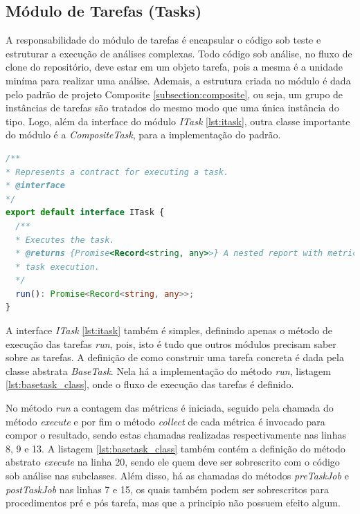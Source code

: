 \documentclass[12pt]{tcc}
\begin{document}
	\subsection{Módulo de Tarefas (Tasks)}
	\label{subsection:modulo-tasks}

	A responsabilidade do módulo de tarefas é encapsular o código sob teste e estruturar a execução de análises complexas.
	Todo código sob análise, no fluxo de clone do repositório, deve estar em um objeto tarefa, pois a mesma é a unidade miníma para realizar uma análise.
	Ademais, a estrutura criada no módulo é dada pelo padrão de projeto Composite \ref{subsection:composite}, ou seja, um grupo de instâncias de tarefas são tratados do mesmo modo que uma única instância do tipo.
	Logo, além da interface do módulo \emph{ITask} \ref{lst:itask}, outra classe importante do módulo é a \emph{CompositeTask}, para a implementação do padrão.

\begin{lstlisting}[label={lst:itask}, caption={Interface do módulo de tarefas.}, language=TypeScript, breaklines=true]
/**
* Represents a contract for executing a task.
* @interface
*/
export default interface ITask {
  /**
  * Executes the task.
  * @returns {Promise<Record<string, any>>} A nested report with metrics and metadata about the
  * task execution.
  */
  run(): Promise<Record<string, any>>;
}   
\end{lstlisting}

	A interface \emph{ITask} \ref{lst:itask} também é simples, definindo apenas o método de execução das tarefas \emph{run}, pois, isto é tudo que outros módulos precisam saber sobre as tarefas.
	A definição de como construir uma tarefa concreta é dada pela classe abstrata \emph{BaseTask}.
	Nela há a implementação do método \emph{run}, listagem \ref{lst:basetask_class}, onde o fluxo de execução das tarefas é definido.

	No método \emph{run} a contagem das métricas é iniciada, seguido pela chamada do método \emph{execute} e por fim o método \emph{collect} de cada métrica é invocado para compor o resultado, sendo estas chamadas realizadas respectivamente nas linhas 8, 9 e 13.
	A listagem \ref{lst:basetask_class} também contém a definição do método abstrato \emph{execute} na linha 20, sendo ele quem deve ser sobrescrito com o código sob análise nas subclasses.
	Além disso, há as chamadas do métodos \emph{preTaskJob} e \emph{postTaskJob} nas linhas 7 e 15, os quais também podem ser sobrescritos para procedimentos pré e pós tarefa, mas que a principio não possuem efeito algum.
\end{document}
